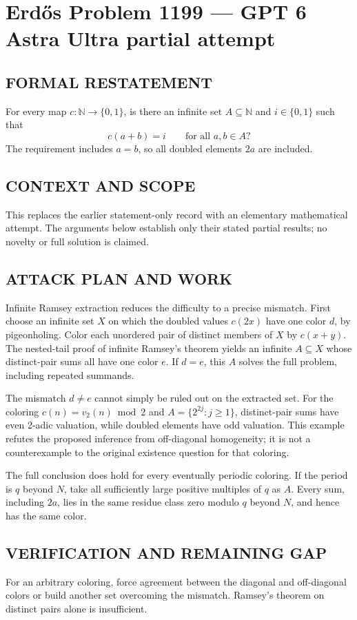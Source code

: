 \section*{Erd\H{o}s Problem 1199 --- GPT 6 Astra Ultra partial attempt}


\subsection*{FORMAL RESTATEMENT}
For every map $c:\mathbb N\to\{0,1\}$, is there an infinite set $A\subseteq\mathbb N$ and $i\in\{0,1\}$ such that
\[c(a+b)=i\qquad\text{for all }a,b\in A?\]
The requirement includes $a=b$, so all doubled elements $2a$ are included.

\subsection*{CONTEXT AND SCOPE}
This replaces the earlier statement-only record with an elementary mathematical attempt. The arguments below establish only their stated partial results; no novelty or full solution is claimed.

\subsection*{ATTACK PLAN AND WORK}
Infinite Ramsey extraction reduces the difficulty to a precise mismatch.
First choose an infinite set $X$ on which the doubled values $c(2x)$ have
one color $d$, by pigeonholing. Color each unordered pair of distinct members
of $X$ by $c(x+y)$. The nested-tail proof of infinite Ramsey's theorem yields
an infinite $A\subseteq X$ whose distinct-pair sums all have one color $e$.
If $d=e$, this $A$ solves the full problem, including repeated summands.

The mismatch $d\ne e$ cannot simply be ruled out on the extracted set.
For the coloring $c(n)=v_2(n)\bmod2$ and $A=\{2^{2j}:j\ge1\}$, distinct-pair
sums have even 2-adic valuation, while doubled elements have odd valuation.
This example refutes the proposed inference from off-diagonal homogeneity;
it is not a counterexample to the original existence question for that coloring.

The full conclusion does hold for every eventually periodic coloring.
If the period is $q$ beyond $N$, take all sufficiently large positive multiples
of $q$ as $A$. Every sum, including $2a$, lies in the same residue class zero
modulo $q$ beyond $N$, and hence has the same color.

\subsection*{VERIFICATION AND REMAINING GAP}
For an arbitrary coloring, force agreement between the diagonal and
off-diagonal colors or build another set overcoming the mismatch. Ramsey's
theorem on distinct pairs alone is insufficient.

